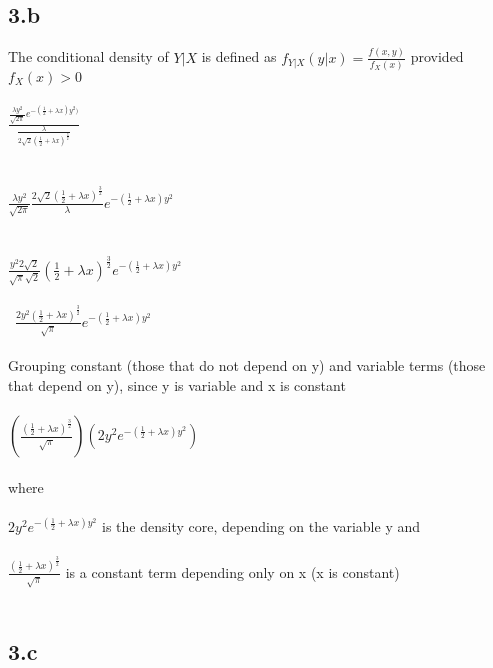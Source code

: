 \documentclass[11pt]{article}   	%
\begin{document}
\subsection*{3.b}

The conditional density of $ Y | X $ is defined as $ f_{Y | X } (y | x) = \frac{f(x, y)}{f_X(x)} $ provided $ f_X(x) > 0 $ \\
\\
$ \frac { \frac{\lambda y^2}{\sqrt{2 \pi} } e^{-( \frac{1}{2} + \lambda x ) y^2 ) } } { \frac{\lambda}{2 \sqrt{2} (\frac{1}{2} + \lambda x)^{\frac{3}{2}} } } $ \\
\\\\
$  \frac{\lambda y^2 }{ \sqrt{2 \pi} } \frac{ 2 \sqrt{2} (\frac{1}{2} + \lambda x)^{\frac{3}{2}} } {\lambda}  e^{-( \frac{1}{2} + \lambda x ) y^2  } $ \\
\\\\
$  \frac{ y^2 2 \sqrt{2} }{ \sqrt{\pi} \sqrt{2} } (\frac{1}{2} + \lambda x)^{\frac{3}{2}}  e^{-( \frac{1}{2} + \lambda x ) y^2 } $ \\
\\\
$ \frac { 2 y^{2} (\frac{1}{2} + \lambda x)^{\frac{3}{2}} } { \sqrt{ \pi } }  e^{ -(\frac{1}{2} + \lambda x ) y^2 } $ \\
\\
Grouping constant (those that do not depend on y) and variable terms (those that depend on y), since y is variable and x is constant \\
\\
$ ( \frac { ( \frac{1}{2} + \lambda x )^{\frac{3}{2}} }{ \sqrt{ \pi } } ) ( 2 y^{2} e^{-( \frac{1}{2} + \lambda x )y^2 } ) $ \\
\\
where \\
\\
$ 2 y^{2} e^{ - ( \frac{1}{2} + \lambda x ) y^2 } $ is the density core, depending on the variable y and \\
\\
$ \frac { ( \frac{1}{2} + \lambda x )^{\frac{3}{2}} }{ \sqrt{ \pi } } $ is a constant term depending only on x (x is constant) \\
\\


\subsection*{3.c}
\end{document}
